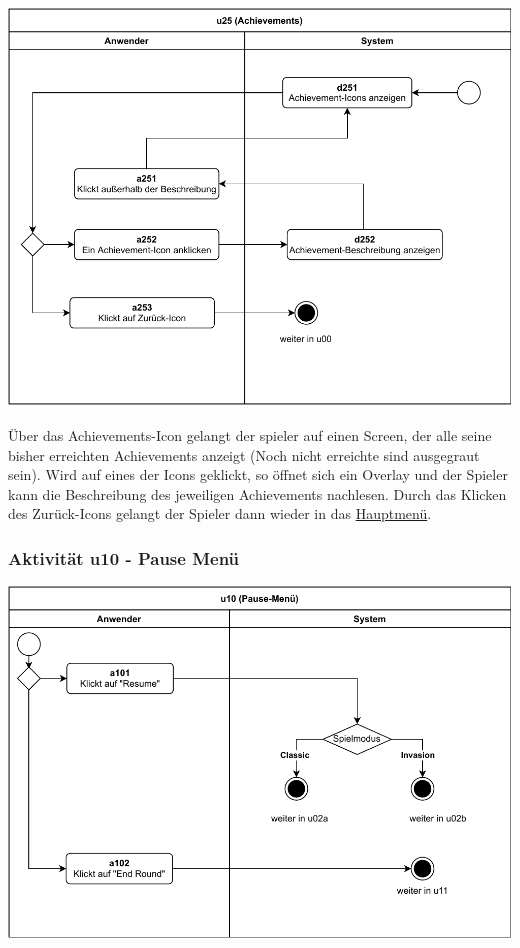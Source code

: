 \includegraphics[width=\linewidth]{diagramme/pdf/UML-Activity-u25.pdf}
\label{fig:dia:achievements}
\vspace*{0.5cm}

Über das Achievements-Icon gelangt der \gls{spieler} auf einen Screen, der alle seine bisher erreichten Achievements anzeigt (Noch nicht erreichte sind ausgegraut sein). Wird auf eines der Icons geklickt, so öffnet sich ein Overlay und der Spieler kann die Beschreibung des jeweiligen Achievements nachlesen. Durch das Klicken des Zurück-Icons gelangt der Spieler dann wieder in das \hyperref[fig:dia:mainMenu]{Hauptmenü}. 

\clearpage

\subsubsection{Aktivität u10 - Pause Menü}


\vspace*{1cm}

\includegraphics[width=\linewidth]{diagramme/pdf/UML-Activity-u10.pdf}
\label{fig:dia:pause}
\vspace*{0.5cm}


